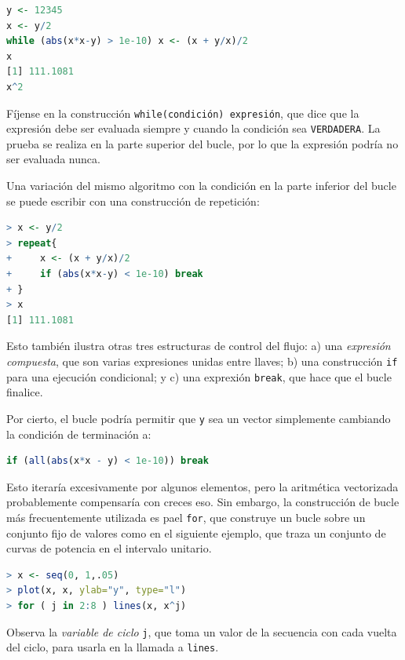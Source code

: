\begin{lstlisting}[language=R]
y <- 12345
x <- y/2
while (abs(x*x-y) > 1e-10) x <- (x + y/x)/2
x
[1] 111.1081
x^2
\end{lstlisting}

Fíjense en la construcción \texttt{while(condición) expresión}, que dice
que la expresión debe ser evaluada siempre y cuando la condición sea
\texttt{VERDADERA}. La prueba se realiza en la parte superior del bucle, por lo
que la expresión podría no ser evaluada nunca.

Una variación del mismo algoritmo con la condición en la parte inferior del
bucle se puede escribir con una construcción de repetición:

\begin{lstlisting}[language=R]
> x <- y/2
> repeat{
+     x <- (x + y/x)/2
+     if (abs(x*x-y) < 1e-10) break
+ }
> x
[1] 111.1081
\end{lstlisting}

Esto también ilustra otras tres estructuras de control del flujo: a) una
\textit{expresión compuesta}, que son varias expresiones unidas entre llaves; b)
una construcción \texttt{if} para una ejecución condicional; y c) una exprexión
\texttt{break}, que hace que el bucle finalice.

Por cierto, el bucle podría permitir que \texttt{y} sea un vector simplemente
cambiando la condición de terminación a:

\begin{lstlisting}[language=R]
if (all(abs(x*x - y) < 1e-10)) break
\end{lstlisting}

Esto iteraría excesivamente por algunos elementos, pero la aritmética
vectorizada probablemente compensaría con creces eso. Sin embargo, la
construcción de bucle más frecuentemente utilizada es pael \texttt{for}, que
construye un bucle sobre un conjunto fijo de valores como en el siguiente
ejemplo, que traza un conjunto de curvas de potencia en el intervalo unitario.

\begin{lstlisting}[language=R]
> x <- seq(0, 1,.05)
> plot(x, x, ylab="y", type="l")
> for ( j in 2:8 ) lines(x, x^j)
\end{lstlisting}

Observa la \textit{variable de ciclo} \texttt{j}, que toma un valor de la
secuencia con cada vuelta del ciclo, para usarla en la llamada a \texttt{lines}.

